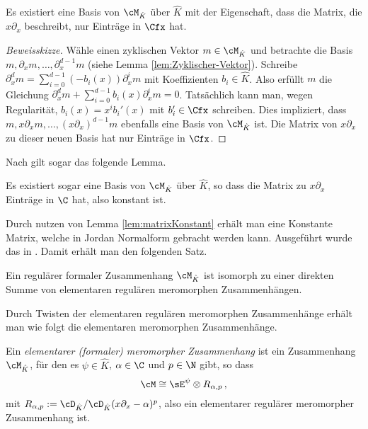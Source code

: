 \begin{lem}
Es existiert eine Basis von $\cM_{\hat K}$ über $\hat K$ mit der Eigenschaft,
dass die Matrix, die $x\partial_x$ beschreibt, nur Einträge in $\Cfx$ hat.
\end{lem}
\begin{comment}
\cite[Lem 5.2.1.]{sabbah_cimpa90}
\end{comment}
\begin{proof}[Beweisskizze] 
Wähle einen zyklischen Vektor $m\in\cM_{\hat K}$ %
und betrachte die Basis
\linebreak
$m,\partial_x m,\dots,\partial_x^{d-1}m$ (siehe Lemma
\ref{lem:Zyklischer-Vektor}).
Schreibe $\partial_x^dm=\sum_{i=0}^{d-1}(-b_i(x))\partial_x^im$ mit
Koeffizienten $b_i\in\hat K$.
Also erfüllt $m$ die Gleichung
$\partial_x^dm+\sum_{i=0}^{d-1}b_i(x)\partial_x^im=0$.
Tatsächlich kann man, wegen Regularität, $b_i(x)=x^ib_i'(x)$ mit $b_i'\in \Cfx$
schreiben.
Dies impliziert, dass
\linebreak
$m,x\partial_xm,\dots,(x\partial_x)^{d-1}m$ ebenfalls
eine Basis von $\cM_{\hat K}$ ist.
Die Matrix von $x\partial_x$ zu dieser neuen Basis hat nur Einträge in $\Cfx$.
\end{proof}
Nach \cite[Thm 5.2.2]{sabbah_cimpa90} gilt sogar das folgende Lemma.
\begin{lem} \label{lem:matrixKonstant}
Es existiert sogar eine Basis von $\cM_{\hat K}$ über $\hat K$, so dass die
Matrix zu $x\partial_x$ Einträge in $\C$ hat, also konstant ist.
\end{lem}

Durch nutzen von Lemma \ref{lem:matrixKonstant} erhält man eine Konstante
Matrix, welche in Jordan Normalform gebracht werden kann. 
Ausgeführt wurde das in \cite[Cor. 5.2.6]{sabbah_cimpa90}.
Damit erhält man den folgenden Satz.
\begin{thm} \label{thm:regulaerInDirSumme}
Ein regulärer formaler Zusammenhang $\cM_{\hat K}$ ist isomorph zu einer
direkten Summe von elementaren regulären meromorphen Zusammenhängen.
\end{thm}

Durch Twisten der elementaren regulären meromorphen Zusammenhänge erhält man
wie folgt die elementaren meromorphen Zusammenhänge.
\begin{defn} \label{defn:elemMerZsh}
Ein \emph{elementarer (formaler) meromorpher Zusammenhang} ist ein Zusammenhang
$\cM_{\hat K}$, für den es $\psi \in \hat K$, $\alpha\in\C$ und $p\in \N$ gibt,
so dass
\[
\cM\cong \sE^{\psi}\otimes R_{\alpha,p}\,,
\]
mit $R_{\alpha,p}:=\cD_{\hat K}/\cD_{\hat K}(x\partial_x-\alpha)^p$, also ein
elementarer regulärer meromorpher Zusammenhang ist.
\end{defn}


